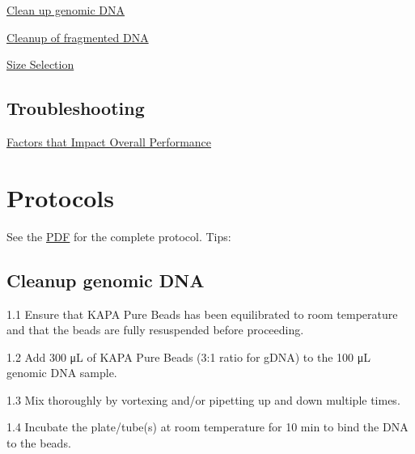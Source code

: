 \documentclass[
  letterpaper,
  DIV=11,
  numbers=noendperiod]{scrreprt}
\begin{document}
\href{https://drk-lo.github.io/lotterhoslabprotocols/molecprot_magbeadwash/\#clean-up-genomic-dna}{Clean
up genomic DNA}

\href{https://drk-lo.github.io/lotterhoslabprotocols/molecprot_magbeadwash/\#cleanup-of-fragmented-dna}{Cleanup
of fragmented DNA}

\href{https://drk-lo.github.io/lotterhoslabprotocols/molecprot_magbeadwash/\#size-selection}{Size
Selection}

\hypertarget{troubleshooting}{%
\subsection*{\texorpdfstring{\textbf{Troubleshooting}}{Troubleshooting}}\label{troubleshooting}}

\href{https://drk-lo.github.io/lotterhoslabprotocols/molecprot_magbeadwash/\#factors-that-impact-overall-performance}{Factors
that Impact Overall Performance}

\hypertarget{protocols-1}{%
\section*{\texorpdfstring{\textbf{Protocols}}{Protocols}}\label{protocols-1}}


See the
\href{https://www.kapabiosystems.com/document/kapa-pure-beads-tds/?dl=1}{PDF}
for the complete protocol. Tips:

\hypertarget{cleanup-genomic-dna}{%
\subsection*{\texorpdfstring{\textbf{Cleanup genomic
DNA}}{Cleanup genomic DNA}}\label{cleanup-genomic-dna}}

1.1 Ensure that KAPA Pure Beads has been equilibrated to room
temperature and that the beads are fully resuspended before proceeding.

1.2 Add 300 μL of KAPA Pure Beads (3:1 ratio for gDNA) to the 100 μL
genomic DNA sample.

1.3 Mix thoroughly by vortexing and/or pipetting up and down multiple
times.

1.4 Incubate the plate/tube(s) at room temperature for 10 min to bind
the DNA to the beads.
\end{document}
